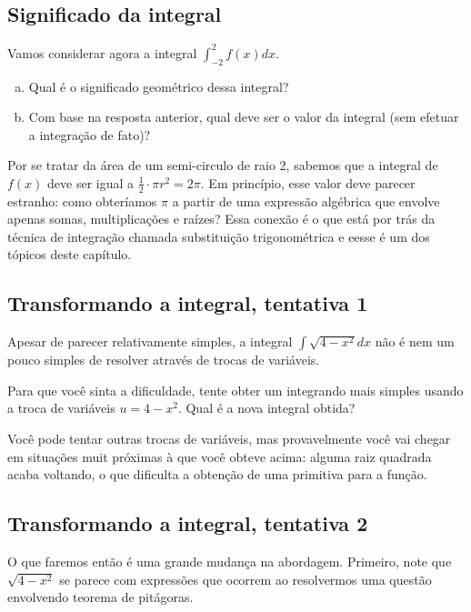 \documentclass[main_estudante.tex]{subfiles}
\begin{document}
\subsection*{Significado da integral}

\begin{questao}
Vamos considerar agora a integral $\int_{-2}^{2} f(x)dx$.
\begin{enumerate}[a)]
\item Qual é o significado geométrico dessa integral?
\item Com base na resposta anterior, qual deve ser o valor da integral (sem efetuar a integração de fato)?
\end{enumerate}
\end{questao}

Por se tratar da área de um semi-circulo de raio 2, sabemos que a integral de $f(x)$ deve ser igual a $\frac{1}{2} \cdot \pi r^2 = 2\pi$. Em princípio, esse valor deve parecer estranho: como obteríamos $\pi$ a partir de uma expressão algébrica que envolve apenas somas, multiplicações e raízes? Essa conexão é o que está por trás da técnica de integração chamada substituição trigonométrica e eesse é um dos tópicos deste capítulo.

\subsection*{Transformando a integral, tentativa 1}

Apesar de parecer relativamente simples, a integral $\int \sqrt{4-x^2}dx$ não é nem um pouco simples de resolver através de trocas de variáveis.

\begin{questao}
Para que você sinta a dificuldade, tente obter um integrando mais simples usando a troca de variáveis $u=4-x^2$. Qual é a nova integral obtida?
\end{questao}

Você pode tentar outras trocas de variáveis, mas provavelmente você vai chegar em situações muit próximas à que você obteve acima: alguma raiz quadrada acaba voltando, o que dificulta a obtenção de uma primitiva para a função.

\subsection*{Transformando a integral, tentativa 2}

O que faremos então é uma grande mudança na abordagem. Primeiro, note que $\sqrt{4-x^2}$ se parece com expressões que ocorrem ao resolvermos uma questão envolvendo teorema de pitágoras.
\end{document}
